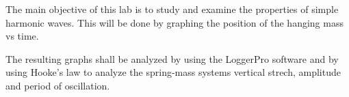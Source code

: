 {The main objective of this lab is to study and examine the properties of simple harmonic waves. This will be done by graphing the position of the hanging mass vs time.}

{The resulting graphs shall be analyzed by using the LoggerPro software and by using Hooke's law to analyze the spring-mass systems vertical strech, amplitude and period of oscillation.}

{}

